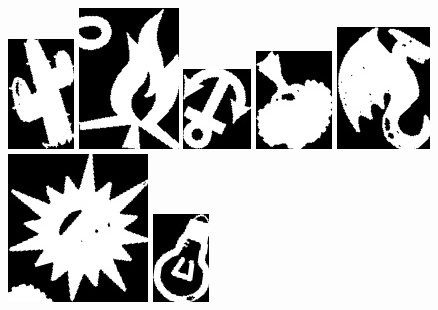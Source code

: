 \documentclass[10pt,a4paper]{article}
\begin{document}
\begin{center}
\includegraphics[scale=0.25]{2.3/sign11.jpg}
\includegraphics[scale=0.25]{2.3/sign12.jpg}
\includegraphics[scale=0.25]{2.3/sign13.jpg}
\includegraphics[scale=0.25]{2.3/sign14.jpg}
\includegraphics[scale=0.25]{2.3/sign15.jpg}
\includegraphics[scale=0.25]{2.3/sign16.jpg}
\includegraphics[scale=0.25]{2.3/sign17.jpg}

\end{center}
\end{document}
